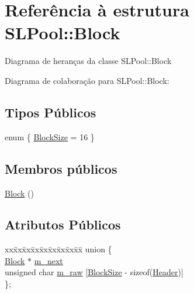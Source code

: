 \hypertarget{structSLPool_1_1Block}{}\section{Referência à estrutura S\+L\+Pool\+:\+:Block}
\label{structSLPool_1_1Block}


Diagrama de heranças da classe S\+L\+Pool\+:\+:Block


Diagrama de colaboração para S\+L\+Pool\+:\+:Block\+:
\subsection*{Tipos Públicos}
\begin{DoxyCompactItemize}
\item 
enum \{ \hyperlink{structSLPool_1_1Block_adbb416e65dd0d7aa2121e30b34424db8a32fd11caed7c39eb5ab3949a612a14b9}{Block\+Size} = 16
 \}
\end{DoxyCompactItemize}
\subsection*{Membros públicos}
\begin{DoxyCompactItemize}
\item 
\hyperlink{structSLPool_1_1Block_a2657816d1a41e84aa7ad25cdcf83ac60}{Block} ()
\end{DoxyCompactItemize}
\subsection*{Atributos Públicos}
\begin{DoxyCompactItemize}
\item 
\begin{tabbing}
xx\=xx\=xx\=xx\=xx\=xx\=xx\=xx\=xx\=\kill
union \{\\
\>\hyperlink{structSLPool_1_1Block}{Block} $\ast$ \hyperlink{structSLPool_1_1Block_a4b7b155392ff1a250c936997e6fcd8a8}{m\_next}\\
\>unsigned char \hyperlink{structSLPool_1_1Block_a4dd3aef4630ff625cd9bc36c10bf7896}{m\_raw} \mbox{[}\hyperlink{structSLPool_1_1Block_adbb416e65dd0d7aa2121e30b34424db8a32fd11caed7c39eb5ab3949a612a14b9}{BlockSize} -\/ sizeof(\hyperlink{structSLPool_1_1Header}{Header})\mbox{]}\\
\}; \\

\end{tabbing}\end{DoxyCompactItemize}


